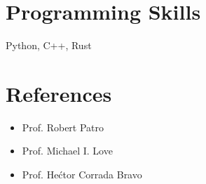 \documentclass{res}
\begin{document}
\begin{resume}
\section{Programming Skills}
Python, C++, Rust





\section{References}
\begin{itemize}
 \item Prof. Robert Patro 
 \item Prof. Michael I. Love
 \item Prof. He\'ctor Corrada Bravo
\end{itemize}

\end{resume}
\end{document}
